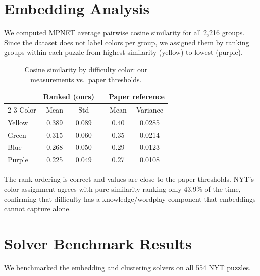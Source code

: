 \documentclass[11pt]{article}
\begin{document}
\section{Embedding Analysis}

We computed MPNET average pairwise cosine similarity for all 2,216 groups.
Since the dataset does not label colors per group, we assigned them by ranking
groups within each puzzle from highest similarity (yellow) to lowest (purple).

\begin{table}[h]
\centering
\caption{Cosine similarity by difficulty color: our measurements vs.\ paper thresholds.}
\begin{tabular}{@{}lccccc@{}}
\toprule
 & \multicolumn{2}{c}{Ranked (ours)} & & \multicolumn{2}{c}{Paper reference} \\
\cmidrule{2-3} \cmidrule{5-6}
Color & Mean & Std & & Mean & Variance \\
\midrule
\colorbox{yellow_conn}{Yellow} & 0.389 & 0.089 & & 0.40 & 0.0285 \\
\colorbox{green_conn}{Green}   & 0.315 & 0.060 & & 0.35 & 0.0214 \\
\colorbox{blue_conn}{Blue}     & 0.268 & 0.050 & & 0.29 & 0.0123 \\
\colorbox{purple_conn}{Purple} & 0.225 & 0.049 & & 0.27 & 0.0108 \\
\bottomrule
\end{tabular}
\end{table}

The rank ordering is correct and values are close to the paper thresholds.
NYT's color assignment agrees with pure similarity ranking only 43.9\% of the
time, confirming that difficulty has a knowledge/wordplay component that
embeddings cannot capture alone.

\section{Solver Benchmark Results}

We benchmarked the embedding and clustering solvers on all 554 NYT puzzles.
\end{document}
